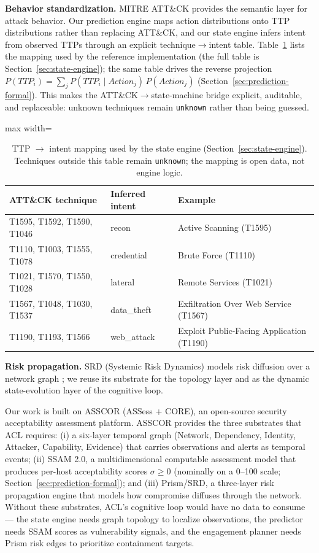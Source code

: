\documentclass[preprints,article,accept,oneauthor]{Definitions/mdpi}
\newcommand{\act}[1]{\texttt{#1}}
\begin{document}
\textbf{Behavior standardization.} MITRE ATT\&CK \citep{attck} provides the
semantic layer for attack behavior. Our prediction engine maps action
distributions onto TTP distributions rather than replacing ATT\&CK, and our
state engine infers intent from observed TTPs through an explicit
technique$\to$intent table. Table~\ref{tab:ttp-intent} lists the mapping
used by the reference implementation (the full table is
Section~\ref{sec:state-engine}); the same table drives the reverse projection
$P(\mathit{TTP}_i) = \sum_j P(\mathit{TTP}_i \mid \mathit{Action}_j)\,
P(\mathit{Action}_j)$ (Section~\ref{sec:prediction-formal}). This makes the
ATT\&CK$\to$state-machine bridge explicit, auditable, and replaceable:
unknown techniques remain \act{unknown} rather than being guessed.

\begin{table}[ht]
\centering
\begin{adjustbox}{max width=\linewidth}\begin{tabular}{@{}lll@{}}
\toprule
\textbf{ATT\&CK technique} & \textbf{Inferred intent} & \textbf{Example} \\
\midrule
T1595, T1592, T1590, T1046 & recon & Active Scanning (T1595) \\
T1110, T1003, T1555, T1078 & credential & Brute Force (T1110) \\
T1021, T1570, T1550, T1028 & lateral & Remote Services (T1021) \\
T1567, T1048, T1030, T1537 & data\_theft & Exfiltration Over Web Service (T1567) \\
T1190, T1193, T1566 & web\_attack & Exploit Public-Facing Application (T1190) \\
\bottomrule
\end{tabular}\end{adjustbox}
\caption{TTP $\rightarrow$ intent mapping used by the state engine
(Section~\ref{sec:state-engine}). Techniques outside this table remain
\act{unknown}; the mapping is open data, not engine logic.}
\label{tab:ttp-intent}
\end{table}

\textbf{Risk propagation.} SRD (Systemic Risk Dynamics) models risk
diffusion over a network graph \citep{asscor-wp}; we reuse its substrate for
the topology layer and as the dynamic state-evolution layer of the
cognitive loop.

Our work is built on ASSCOR (ASSess + CORE), an open-source security acceptability assessment platform. ASSCOR provides the three substrates that ACL requires: (i) a six-layer temporal graph (Network, Dependency, Identity, Attacker, Capability, Evidence) that carries observations and alerts as temporal events; (ii) SSAM 2.0, a multidimensional computable assessment model that produces per-host acceptability scores $\sigma \ge 0$ (nominally on a
0--100 scale; Section~\ref{sec:prediction-formal}); and (iii) Prism/SRD, a three-layer risk propagation engine that models how compromise diffuses through the network. Without these substrates, ACL's cognitive loop would have no data to consume --- the state engine needs graph topology to localize observations, the predictor needs SSAM scores as vulnerability signals, and the engagement planner needs Prism risk edges to prioritize containment targets.
\end{document}
